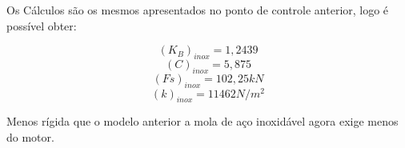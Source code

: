 Os Cálculos são os mesmos apresentados no ponto de controle anterior, logo é possível obter:

$$(K_B)_{inox}=1,2439$$
$$(C)_{inox}=5,875 $$
$$(Fs)_{inox}=102,25kN $$
$$(k)_{inox}=11462 N/m^2$$

Menos rígida que o modelo anterior a mola de aço inoxidável agora exige menos do motor.







